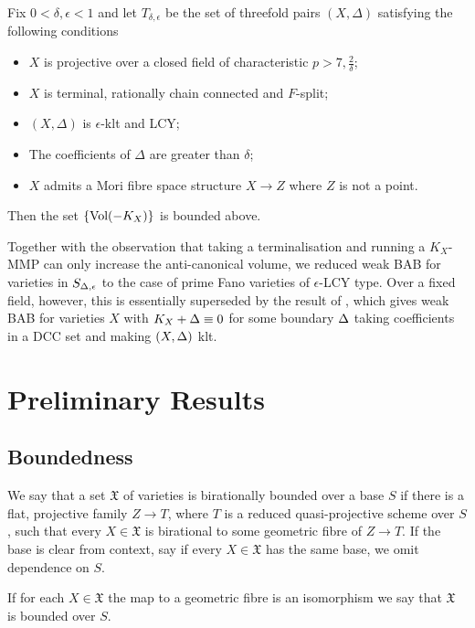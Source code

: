 	\begin{theorem}\label{Main2}
		Fix $0 < \delta, \epsilon <1$ and let $T_{\delta,\epsilon}$ be the set of threefold pairs $(X,\Delta)$ satisfying the following conditions
		\begin{itemize}
			\item $X$ is projective over a closed field of characteristic $p >7,\frac{2}{\delta}$;
			 \item $X$ is terminal, rationally chain connected and $F$-split;
			\item $(X,\Delta)$ is $\epsilon$-klt and LCY;
			\item The coefficients of $\Delta$ are greater than $\delta$;
			\item $X$ admits a Mori fibre space structure $X \to Z$ where $Z$ is not a point.
		\end{itemize}
	Then the set $\{\text{Vol}(-K_{X})\}$ is bounded above. 
	\end{theorem}
	\begin{remark}
		Together with the observation that taking a terminalisation and running a $K_{X}$-MMP can only increase the anti-canonical volume, we reduced weak BAB for varieties in $S_{\Delta,\epsilon}$ to the case of prime Fano varieties of $\epsilon$-LCY type. Over a fixed field, however, this is essentially superseded by the result of \cite{das2018boundedness}, which gives weak BAB for varieties $X$ with $K_{X}+\Delta \equiv 0$ for some boundary $\Delta$ taking coefficients in a DCC set and making $(X,\Delta)$ klt. 
	\end{remark}

	


\section{Preliminary Results}

\subsection{Boundedness}

\begin{definition}\label{d_birationally-bounded} We say that a set $\mathfrak{X}$ 
	of varieties is birationally bounded over a base $S$ if there is a flat, projective family $Z \to T$, where $T$ is a reduced quasi-projective scheme over $S$, such that every $X\in \mathfrak{X}$ is birational to some geometric fibre of $Z \to T$. If the base is clear from context, say if every $X \in \mathfrak{X}$ has the same base, we omit dependence on $S$.
	
	If for each $X \in \mathfrak{X}$ the map to a geometric fibre is an isomorphism we say that $\mathfrak{X}$ is bounded over $S$.
\end{definition}

